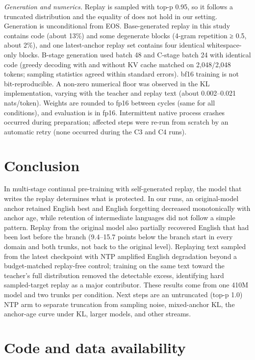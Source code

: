 \documentclass[11pt]{article}
\begin{document}
\emph{Generation and numerics.} Replay is sampled with top-p 0.95, so it follows a truncated distribution and the equality of \citet[Eq.~1]{marek2026} does not hold in our setting. Generation is unconditional from EOS. Base-generated replay in this study contains code (about 13\%) and some degenerate blocks (4-gram repetition ≥ 0.5, about 2\%), and one latest-anchor replay set contains four identical whitespace-only blocks. B-stage generation used batch 48 and C-stage batch 24 with identical code (greedy decoding with and without KV cache matched on 2,048/2,048 tokens; sampling statistics agreed within standard errors). bf16 training is not bit-reproducible. A non-zero numerical floor was observed in the KL implementation, varying with the teacher and replay text (about 0.002–0.021 nats/token). Weights are rounded to fp16 between cycles (same for all conditions), and evaluation is in fp16. Intermittent native process crashes occurred during preparation; affected steps were re-run from scratch by an automatic retry (none occurred during the C3 and C4 runs).


\section{Conclusion}

In multi-stage continual pre-training with self-generated replay, the model that writes the replay determines what is protected. In our runs, an original-model anchor retained English best and English forgetting decreased monotonically with anchor age, while retention of intermediate languages did not follow a simple pattern. Replay from the original model also partially recovered English that had been lost before the branch (9.4–15.7 points below the branch start in every domain and both trunks, not back to the original level). Replaying text sampled from the latest checkpoint with NTP amplified English degradation beyond a budget-matched replay-free control; training on the same text toward the teacher's full distribution removed the detectable excess, identifying hard sampled-target replay as a major contributor. These results come from one 410M model and two trunks per condition. Next steps are an untruncated (top-p 1.0) NTP arm to separate truncation from sampling noise, mixed-anchor KL, the anchor-age curve under KL, larger models, and other streams.

\section*{Code and data availability}
\end{document}

